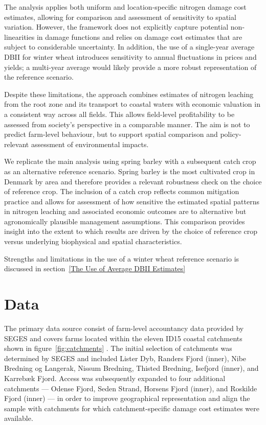\documentclass[12pt]{article}
\begin{document}
The analysis applies both uniform and location-specific nitrogen damage cost estimates, allowing for comparison and assessment of sensitivity to spatial variation. However, the framework does not explicitly capture potential non-linearities in damage functions and relies on damage cost estimates that are subject to considerable uncertainty. In addition, the use of a single-year average DBII for winter wheat introduces sensitivity to annual fluctuations in prices and yields; a multi-year average would likely provide a more robust representation of the reference scenario.

Despite these limitations, the approach combines estimates of nitrogen leaching from the root zone and its transport to coastal waters with economic valuation in a consistent way across all fields. This allows field-level profitability to be assessed from society's perspective in a comparable manner. The aim is not to predict farm-level behaviour, but to support spatial comparison and policy-relevant assessment of environmental impacts.





We replicate the main analysis using spring barley with a subsequent catch crop as an alternative reference scenario. Spring barley is the most cultivated crop in Denmark by area \citep{bramsen2024} and therefore provides a relevant robustness check on the choice of reference crop. The inclusion of a catch crop reflects common mitigation practice and allows for assessment of how sensitive the estimated spatial patterns in nitrogen leaching and associated economic outcomes are to alternative but agronomically plausible management assumptions. This comparison provides insight into the extent to which results are driven by the choice of reference crop versus underlying biophysical and spatial characteristics.

Strengths and limitations in the use of a winter wheat reference scenario is discussed in section~\ref{The Use of Average DBII Estimates}


\section{Data}
\label{sec:data}
The primary data source consist of farm-level accountancy data provided by SEGES and covers farms located within the eleven ID15 coastal catchments shown in figure~\ref{fig:catchments} \citep{seges2025}. 
The initial selection of catchments was determined by SEGES and included Lister Dyb, Randers Fjord (inner), Nibe Bredning og Langerak, Nissum Bredning, Thisted Bredning, Isefjord (inner), and Karrebæk Fjord. 
Access was subsequently expanded to four additional catchments --- Odense Fjord, Seden Strand, Horsens Fjord (inner), and Roskilde Fjord (inner) --- in order to improve geographical representation and align the sample with  catchments for which catchment-specific damage cost estimates were available.
\end{document}

